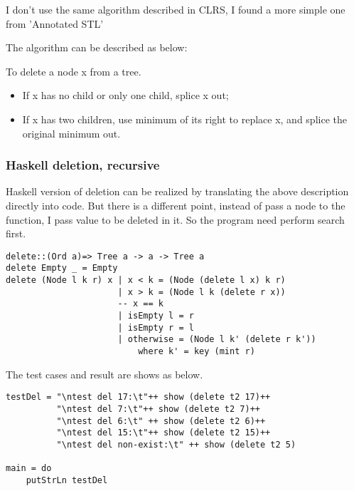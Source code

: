 \documentclass{article}
\begin{document}
I don't use the same algorithm described in CLRS\cite{CLRS}, I found a more simple
one from 'Annotated STL'\cite{hj-stl}

The algorithm can be described as below:

To delete a node x from a tree.
\begin{itemize}
\item If x has no child or only one child, splice x out;
\item If x has two children, use minimum of its right to replace x, 
and splice the original minimum out.
\end{itemize}

\subsubsection*{Haskell deletion, recursive}

Haskell version of deletion can be realized by translating the above description
directly into code. But there is a different point, instead of pass a node to the
function, I pass value to be deleted in it. So the program need perform search first.

\lstset{language=Haskell}
\begin{lstlisting}
delete::(Ord a)=> Tree a -> a -> Tree a
delete Empty _ = Empty
delete (Node l k r) x | x < k = (Node (delete l x) k r)
                      | x > k = (Node l k (delete r x))
                      -- x == k
                      | isEmpty l = r
                      | isEmpty r = l
                      | otherwise = (Node l k' (delete r k')) 
                          where k' = key (mint r)
\end{lstlisting}

The test cases and result are shows as below.

\begin{lstlisting}
testDel = "\ntest del 17:\t"++ show (delete t2 17)++
          "\ntest del 7:\t"++ show (delete t2 7)++
          "\ntest del 6:\t" ++ show (delete t2 6)++
          "\ntest del 15:\t"++ show (delete t2 15)++
          "\ntest del non-exist:\t" ++ show (delete t2 5)

main = do
    putStrLn testDel
\end{lstlisting}
\end{document}
